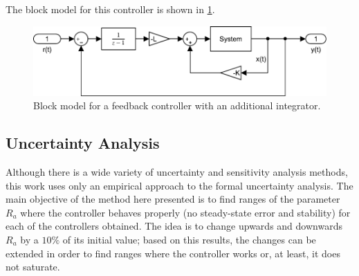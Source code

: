 The block model for this controller is shown in \ref{fig:feedback_refnot0}.
\begin{figure}[H]
    \centering
    \includegraphics[scale=0.5]{files/feedback_refnot0.pdf}
    \caption{Block model for a feedback controller with an additional integrator.}
    \label{fig:feedback_refnot0}
\end{figure}
\subsection{Uncertainty Analysis}\label{sec:uncertainty}
Although there is a wide variety of uncertainty and sensitivity analysis methods, this work uses only an empirical approach to the formal uncertainty analysis. The main objective of the method here presented is to find ranges of the parameter $R_a$ where the controller behaves properly (no steady-state error and stability) for each of the controllers obtained. The idea is to change upwards and downwards $R_a$ by a $10\%$ of its initial value; based on this results, the changes can be extended in order to find ranges where the controller works or, at least, it does not saturate.

 
 
 
